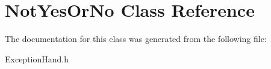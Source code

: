 \hypertarget{class_not_yes_or_no}{}\section{Not\+Yes\+Or\+No Class Reference}
\label{class_not_yes_or_no}


The documentation for this class was generated from the following file\+:\begin{DoxyCompactItemize}
\item 
Exception\+Hand.\+h\end{DoxyCompactItemize}
